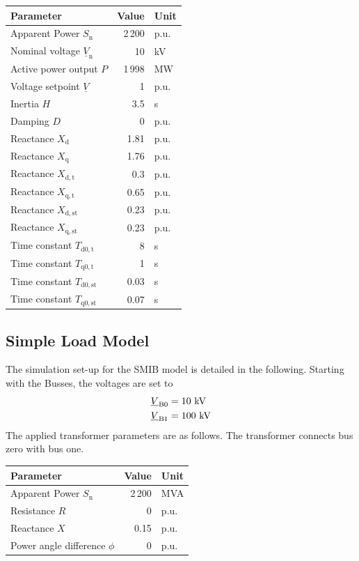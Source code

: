 \begin{tabularx}{\textwidth}{Xrl}
    \textbf{Parameter} & \textbf{Value} & \textbf{Unit} \\ \hline
    \toprule
    Apparent Power $S_\mathrm{n}$ & 2\,200 & p.u. \\
    Nominal voltage $\underline{V}_\mathrm{n}$ & 10 & kV \\
    Active power output $P$ & 1\,998 & MW \\
    Voltage setpoint $\underline{V}$ & 1 & p.u. \\
    Inertia $H$ & 3.5 & s \\
    Damping $D$ & 0 & p.u. \\
    Reactance $X_\mathrm{d}$ & 1.81 & p.u. \\
    Reactance $X_\mathrm{q}$ & 1.76 & p.u. \\
    Reactance $X_\mathrm{d,t}$ & 0.3 & p.u. \\
    Reactance $X_\mathrm{q,t}$ & 0.65 & p.u. \\
    Reactance $X_\mathrm{d,st}$ & 0.23 & p.u. \\
    Reactance $X_\mathrm{q,st}$ & 0.23 & p.u. \\
    Time constant $T_\mathrm{d0,t}$ & 8 & s \\
    Time constant $T_\mathrm{q0,t}$ & 1 & s \\
    Time constant $T_\mathrm{d0,st}$ & 0.03 & s \\
    Time constant $T_\mathrm{q0,st}$ & 0.07 & s \\
    \bottomrule
\end{tabularx}

\vspace*{1cm}

\subsection{Simple Load Model}
\label{app:smib-w-load}

The simulation set-up for the \acs{SMIB} model is detailed in the following.
Starting with the Busses, the voltages are set to
\begin{align}
    \underline{V}_\mathrm{B0} &= 10\text{ kV} \notag \\
    \underline{V}_\mathrm{B1} &= 100\text{ kV} \notag 
\end{align}
The applied transformer parameters are as follows.
The transformer connects bus zero with bus one.

\begin{tabularx}{\textwidth}{Xrl}
    \textbf{Parameter} & \textbf{Value} & \textbf{Unit} \\ \hline
    \toprule
    Apparent Power $S_\mathrm{n}$ & 2\,200 & MVA \\
    Resistance $R$ & 0 & p.u. \\
    Reactance $X$ & 0.15 & p.u. \\
    Power angle difference $\phi$ & 0 & p.u. \\
    \bottomrule
\end{tabularx}

